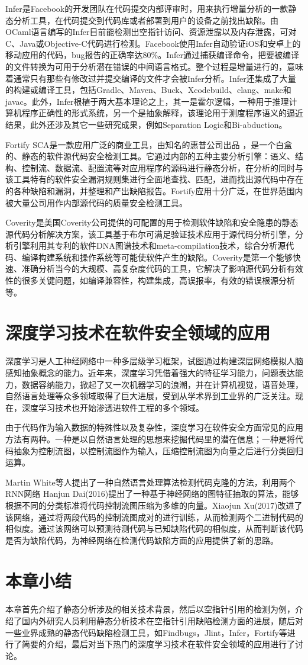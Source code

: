 Infer是Facebook的开发团队在代码提交内部评审时，用来执行增量分析的一款静态分析工具，在代码提交到代码库或者部署到用户的设备之前找出缺陷。由OCaml语言编写的Infer目前能检测出空指针访问、资源泄露以及内存泄露，可对C、Java或Objective-C代码进行检测。Facebook使用Infer自动验证iOS和安卓上的移动应用的代码，bug报告的正确率达80\%。Infer通过捕获编译命令，把要被编译的文件转换为可用于分析潜在错误的中间语言格式。整个过程是增量进行的，意味着通常只有那些有修改过并提交编译的文件才会被Infer分析。Infer还集成了大量的构建或编译工具，包括Gradle、Maven、Buck、Xcodebuild、clang、make和javac。此外，Infer根植于两大基本理论之上，其一是霍尔逻辑，一种用于推理计算机程序正确性的形式系统，另一个是抽象解释，该理论用于测度程序语义的逼近结果，此外还涉及其它一些研究成果，例如Separation Logic和Bi-abduction。

Fortify SCA是一款应用广泛的商业工具，由知名的惠普公司出品 ，是一个白盒的、静态的软件源代码安全检测工具。它通过内部的五种主要分析引擎：语义、结构、控制流、数据流、配置流等对应用程序的源码进行静态分析，在分析的同时与该工具特有的软件安全漏洞规则集进行全面地查找、匹配，进而找出源代码中存在的各种缺陷和漏洞，并整理和产出缺陷报告。Fortify应用十分广泛，在世界范围内被大量公司用作内部源代码的质量安全检测工具。

Coverity是美国Coverity公司提供的可配置的用于检测软件缺陷和安全隐患的静态源代码分析解决方案，该工具基于布尔可满足验证技术应用于源代码分析引擎，分析引擎利用其专利的软件DNA图谱技术和meta-compilation技术，综合分析源代码、编译构建系统和操作系统等可能使软件产生的缺陷。Coverity是第一个能够快速、准确分析当今的大规模、高复杂度代码的工具，它解决了影响源代码分析有效性的很多关键问题，如编译兼容性，构建集成，高误报率，有效的错误根源分析等。

\section{深度学习技术在软件安全领域的应用}
深度学习是人工神经网络中一种多层级学习框架，试图通过构建深层网络模拟人脑感知抽象概念的能力。近年来，深度学习凭借着强大的特征学习能力，问题表达能力，数据容纳能力，掀起了又一次机器学习的浪潮，并在计算机视觉，语音处理，自然语言处理等众多领域取得了巨大进展，受到从学术界到工业界的广泛关注。现在，深度学习技术也开始渗透进软件工程的多个领域。

由于代码作为输入数据的特殊性以及复杂性，深度学习在软件安全方面常见的应用方法有两种。一种是以自然语言处理的思想来挖掘代码里的潜在信息；一种是将代码抽象为控制流图，以控制流图作为输入，压缩控制流图为向量之后进行分类回归运算。

Martin White等人提出了一种自然语言处理算法检测代码克隆的方法，利用两个RNN网络
Hanjun Dai(2016)提出了一种基于神经网络的图特征抽取的算法，能够根据不同的分类标准将代码控制流图压缩为多维的向量。Xiaojun Xu(2017)改进了该网络，通过将两段代码的控制流图成对的进行训练，从而检测两个二进制代码的相似度。通过该网络可以预测待测代码与已知缺陷代码的相似度，从而判断该代码是否为缺陷代码，为神经网络在检测代码缺陷方面的应用提供了新的思路。


\section{本章小结}
本章首先介绍了静态分析涉及的相关技术背景，然后以空指针引用的检测为例，介绍了国内外研究人员利用静态分析技术在空指针引用缺陷检测方面的进展，随后对一些业界成熟的静态代码缺陷检测工具，如Findbugs，Jlint，Infer，Fortify等进行了简要的介绍，最后对当下热门的深度学习技术在软件安全领域的应用进行了讨论。